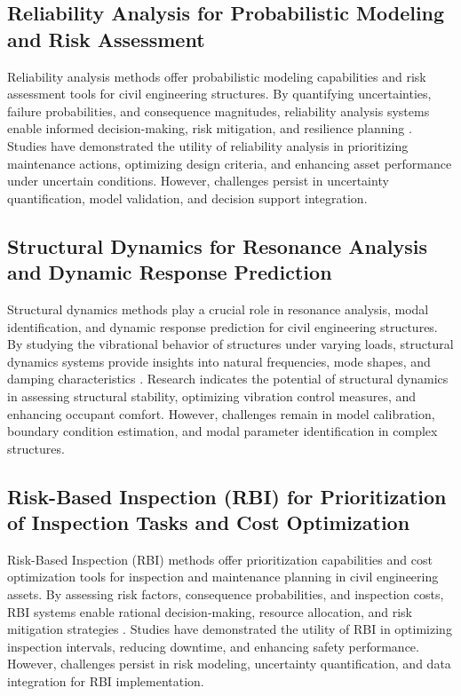 \documentclass[journal, a4paper]{IEEEtran}
\begin{document}
\subsection{Reliability Analysis for Probabilistic Modeling and Risk Assessment}
Reliability analysis methods offer probabilistic modeling capabilities and risk assessment tools for civil engineering structures.
By quantifying uncertainties, failure probabilities, and consequence magnitudes, reliability analysis
systems enable informed decision-making, risk mitigation, and resilience planning \cite{pachon_evaluation_2020} \cite{wu_internal_2024} \cite{zima_damage_2021}.
Studies have demonstrated the utility of reliability analysis in prioritizing maintenance actions,
optimizing design criteria, and enhancing asset performance under uncertain conditions.
However, challenges persist in uncertainty quantification, model validation, and decision support integration.

\subsection{Structural Dynamics for Resonance Analysis and Dynamic Response Prediction}
Structural dynamics methods play a crucial role in resonance analysis, modal identification, and dynamic
response prediction for civil engineering structures. By studying the vibrational behavior of structures under
varying loads, structural dynamics systems provide insights into natural frequencies, mode shapes, and damping
characteristics \cite{de_sa_rodrigues_probability_2023} \cite{zhang_defect_2020} \cite{wang_fatigue_2023}. Research indicates the potential of structural dynamics in assessing structural
stability, optimizing vibration control measures, and enhancing occupant comfort. However, challenges remain in model
calibration, boundary condition estimation, and modal parameter identification in complex structures.

\subsection{Risk-Based Inspection (RBI) for Prioritization of Inspection Tasks and Cost Optimization}
Risk-Based Inspection (RBI) methods offer prioritization capabilities and cost optimization tools for inspection
and maintenance planning in civil engineering assets. By assessing risk factors, consequence probabilities,
and inspection costs, RBI systems enable rational decision-making, resource allocation, and risk mitigation
strategies \cite{wu_internal_2024} \cite{zima_damage_2021} \cite{han_crack_2021}. Studies have demonstrated the utility of RBI in optimizing inspection intervals,
reducing downtime, and enhancing safety performance. However, challenges persist in risk modeling, uncertainty quantification,
and data integration for RBI implementation.
\end{document}
